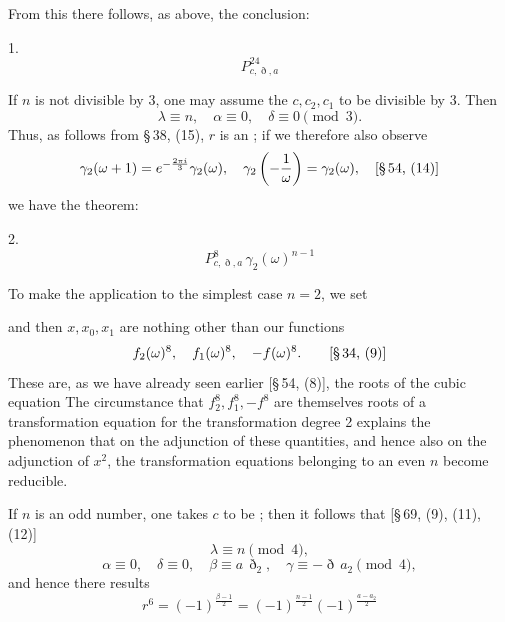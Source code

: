 From this there follows, as above, the conclusion:

1. 
\[
P^{24}_{c,\eth,a}
\]

If $n$ is not divisible by 3, one may assume the $c, c_2, c_1$ to be
divisible by 3. Then
\[
\lambda \equiv n, \quad \alpha \equiv 0, \quad \delta \equiv 0 \pmod{3}.
\]
Thus, as follows from §\,38, (15), $r$ is an ;
if we therefore also observe
\[
\gamma_2(\omega+1) = e^{-\frac{2\pi i}{3}}\gamma_2(\omega), \quad
\gamma_2\left(-\frac{1}{\omega}\right) = \gamma_2(\omega), \quad \text{[§\,54, (14)]}
\]
we have the theorem:

2. 
\[
P^{8}_{c,\eth,a}\,\gamma_2(\omega)^{n-1}
\]

To make the application to the simplest case $n=2$, we set


and then $x, x_0, x_1$ are nothing other than our functions
\[
f_2(\omega)^8, \quad f_1(\omega)^8, \quad -f(\omega)^8. \qquad \text{[§\,34, (9)]}
\]
These are, as we have already seen earlier [§\,54, (8)], the
roots of the cubic equation
The circumstance that $f_2^8, f_1^8, -f^8$ are themselves roots of a transformation equation for the transformation degree 2 explains the
phenomenon that on the adjunction of these quantities, and hence also on
the adjunction of $x^2$, the transformation equations belonging to an even $n$ become reducible.

If $n$ is an odd number, one takes $c$ to be ; then
it follows that [§\,69, (9), (11), (12)]
\[
\lambda \equiv n \pmod{4},
\]
\[
\alpha \equiv 0, \quad \delta \equiv 0, \quad \beta \equiv a\,\eth_2, \quad \gamma \equiv -\eth\,a_2 \pmod{4},
\]
and hence there results
\[
r^6 = (-1)^{\frac{\beta-1}{2}} = (-1)^{\frac{n-1}{2}}(-1)^{\frac{a-a_2}{2}}
\]
